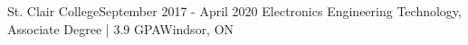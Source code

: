 \resumeSubheading
{St. Clair College}{September 2017 - April 2020}
{Electronics Engineering Technology, Associate Degree | 3.9 GPA}{Windsor, ON}